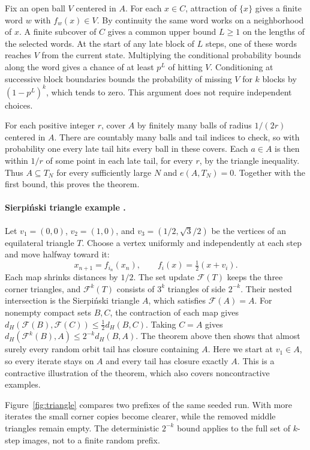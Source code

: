 \documentclass[11pt]{article}
\begin{document}
Fix an open ball $V$ centered in $A$.
For each $x\in C$, attraction of $\{x\}$ gives a finite word $w$ with $f_w(x)\in V$.
By continuity the same word works on a neighborhood of $x$.
A finite subcover of $C$ gives a common upper bound $L\ge1$ on the lengths of the selected words.
At the start of any late block of $L$ steps, one of these words reaches $V$ from the current state.
Multiplying the conditional probability bounds along the word gives a chance of at least $p^L$ of hitting $V$.
Conditioning at successive block boundaries bounds the probability of missing $V$ for $k$ blocks by
$(1-p^L)^k$, which tends to zero.
This argument does not require independent choices.

For each positive integer $r$, cover $A$ by finitely many balls of radius $1/(2r)$ centered in $A$.
There are countably many balls and tail indices to check, so with probability one every late tail hits
every ball in these covers.
Each $a\in A$ is then within $1/r$ of some point in each late tail, for every $r$, by the triangle inequality.
Thus $A\subseteq T_N$ for every sufficiently large $N$ and $e(A,T_N)=0$.
Together with the first bound, this proves the theorem.

\paragraph{Sierpi\'nski triangle example \cite[Chapter~III, Section~8]{barnsley-book}.}
Let $v_1=(0,0)$, $v_2=(1,0)$, and $v_3=(1/2,\sqrt3/2)$ be the vertices of an equilateral triangle $T$.
Choose a vertex uniformly and independently at each step and move halfway toward it:
\[
  x_{n+1}=f_{i_n}(x_n),\qquad f_i(x)=\tfrac12(x+v_i).
\]
Each map shrinks distances by $1/2$.
The set update $\mathcal F(T)$ keeps the three corner triangles, and $\mathcal F^k(T)$ consists of
$3^k$ triangles of side $2^{-k}$.
Their nested intersection is the Sierpi\'nski triangle $A$, which satisfies $\mathcal F(A)=A$.
For nonempty compact sets $B,C$, the contraction of each map gives
$d_H(\mathcal F(B),\mathcal F(C))\le \tfrac12 d_H(B,C)$.
Taking $C=A$ gives $d_H(\mathcal F^k(B),A)\le 2^{-k}d_H(B,A)$.
The theorem above then shows that almost surely every random orbit tail has closure containing $A$.
Here we start at $v_1\in A$, so every iterate stays on $A$ and every tail has closure exactly $A$.
This is a contractive illustration of the theorem, which also covers noncontractive examples.

Figure~\ref{fig:triangle} compares two prefixes of the same seeded run.
With more iterates the small corner copies become clearer, while the removed middle triangles remain empty.
The deterministic $2^{-k}$ bound applies to the full set of $k$-step images, not to a finite random prefix.
\end{document}
